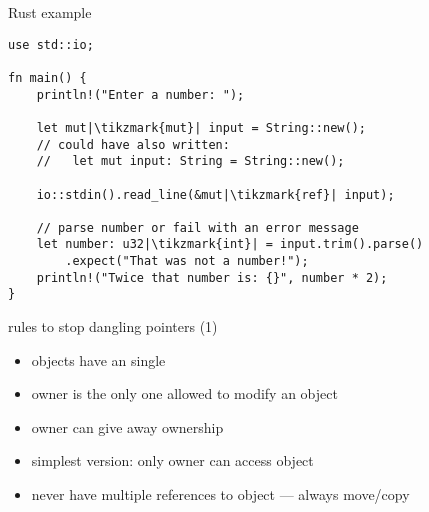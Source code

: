 \begin{frame}[fragile,label=rustTimesTwo]{Rust example}
\vspace{-.25cm}
    \begin{verbatim}
use std::io;

fn main() {
    println!("Enter a number: ");

    let mut|\tikzmark{mut}| input = String::new();
    // could have also written:
    //   let mut input: String = String::new();
    
    io::stdin().read_line(&mut|\tikzmark{ref}| input);

    // parse number or fail with an error message
    let number: u32|\tikzmark{int}| = input.trim().parse()
        .expect("That was not a number!");
    println!("Twice that number is: {}", number * 2);
}
\end{verbatim}
\end{frame}



\begin{frame}{rules to stop dangling pointers (1)}
    \begin{itemize}
    \item objects have an single 
    \item owner is the only one allowed to modify an object
    \item owner can give away ownership
    \item simplest version: only owner can access object
    \item never have multiple references to object --- always move/copy
    \end{itemize}
\end{frame}

